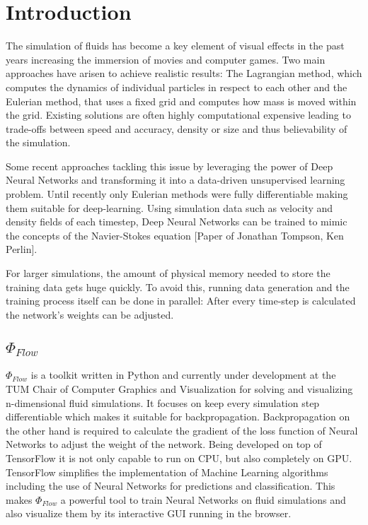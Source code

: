 \chapter{Introduction}\label{chapter:introduction}
The simulation of fluids has become a key element of visual effects in the past years increasing the immersion of movies and computer games. Two main approaches have arisen to achieve realistic results: The Lagrangian method, which computes the dynamics of individual particles in respect to each other and the Eulerian method, that uses a fixed grid and computes how mass is moved within the grid. Existing solutions are often highly computational expensive leading to trade-offs between speed and accuracy, density or size and thus believability of the simulation.\par
Some recent approaches tackling this issue by leveraging the power of Deep Neural Networks and transforming it into a data-driven unsupervised learning problem. Until recently only Eulerian methods were fully differentiable making them suitable for deep-learning. Using simulation data such as velocity and density fields of each timestep, Deep Neural Networks can be trained to mimic the concepts of the Navier-Stokes equation [Paper of Jonathan Tompson, Ken Perlin].\par
For larger simulations, the amount of physical memory needed to store the training data gets huge quickly. To avoid this, running data generation and the training process itself can be done in parallel: After every time-step is calculated the network's weights can be adjusted.
\section{$\Phi_\textit{Flow}$ }
$\Phi_\textit{Flow}$ is a toolkit written in Python and currently under development at the TUM Chair of Computer Graphics and Visualization for solving and visualizing n-dimensional fluid simulations. It focuses on keep every simulation step differentiable which makes it suitable for backpropagation. Backpropagation on the other hand is required to calculate the gradient of the loss function of Neural Networks to adjust the weight of the network. Being developed on top of TensorFlow it is not only capable to run on CPU, but also completely on GPU. TensorFlow simplifies the implementation of Machine Learning algorithms including the use of Neural Networks for predictions and classification. This makes $\Phi_\textit{Flow}$ a powerful tool to train Neural Networks on fluid simulations and also visualize them by its interactive GUI running in the browser. 
